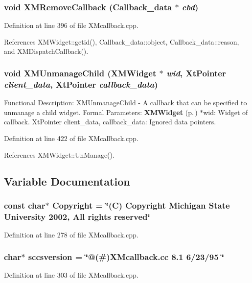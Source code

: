 \subsubsection{\setlength{\rightskip}{0pt plus 5cm}void XMRemove\-Callback ({\bf Callback\_\-data} $\ast$ {\em cbd})}\label{XMcallback_8cpp_a5}




Definition at line 396 of file XMcallback.cpp.

References XMWidget::getid(), Callback\_\-data::object, Callback\_\-data::reason, and XMDispatch\-Callback().
\subsubsection{\setlength{\rightskip}{0pt plus 5cm}void XMUnmanage\-Child ({\bf XMWidget} $\ast$ {\em wid}, Xt\-Pointer {\em client\_\-data}, Xt\-Pointer {\em callback\_\-data})}\label{XMcallback_8cpp_a6}


Functional Description: XMUnmanage\-Child - A callback that can be specified to unmanage a child widget. Formal Parameters: {\bf XMWidget} {\rm (p.\,\pageref{classXMWidget})} $\ast$wid: Widget of callback. Xt\-Pointer client\_\-data, callback\_\-data: Ignored data pointers. 

Definition at line 422 of file XMcallback.cpp.

References XMWidget::Un\-Manage().

\subsection{Variable Documentation}
\subsubsection{\setlength{\rightskip}{0pt plus 5cm}const char$\ast$ Copyright = \char`\"{}(C) Copyright Michigan State University 2002, All rights reserved\char`\"{}\hspace{0.3cm}{\tt  [static]}}\label{XMcallback_8cpp_a0}




Definition at line 278 of file XMcallback.cpp.
\subsubsection{\setlength{\rightskip}{0pt plus 5cm}char$\ast$ sccsversion = \char`\"{}@(\#)XMcallback.cc 8.1 6/23/95 \char`\"{}\hspace{0.3cm}{\tt  [static]}}\label{XMcallback_8cpp_a1}




Definition at line 303 of file XMcallback.cpp.